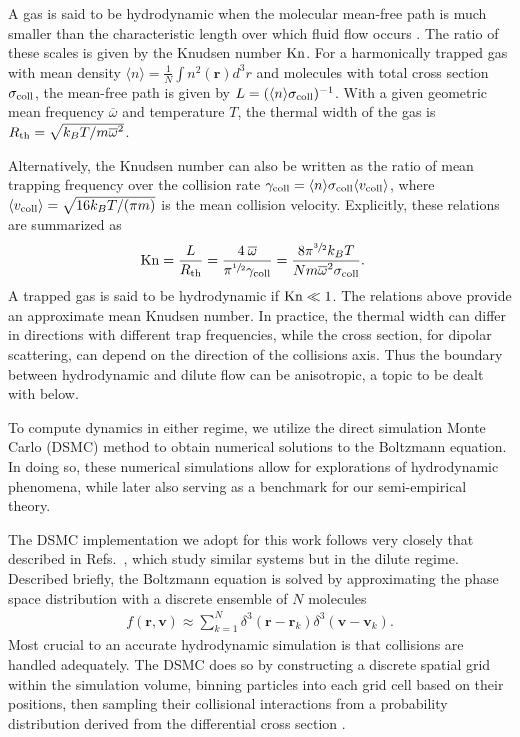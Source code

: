\documentclass[reprint, amsmath, amssymb, aps, superscriptaddress]{revtex4-1}
\begin{document}
 
A gas is said to be hydrodynamic when the molecular mean-free path is much smaller than the characteristic length over which fluid flow occurs \cite{Huang63_NY}. The ratio of these scales is given by the Knudsen number ${\rm Kn}$. For a harmonically trapped gas with mean density $\langle n \rangle = \frac{1}{N} \int n^2(\boldsymbol{r}) d^3 r$ and  molecules with total cross section $\sigma_{\rm coll}$, the mean-free path is given by
$L = ( \langle n \rangle \sigma_{\rm coll} )^{-1}$.  
With a given geometric mean frequency $\overline{\omega}$ and temperature $T$, the thermal width of the gas is
 $R_{\rm th} = \sqrt{ k_B T / m \overline{\omega}^2 }$.
 
Alternatively, the Knudsen number can also be written as the ratio of mean trapping frequency over the collision rate $\gamma_{\rm coll} = \langle n \rangle \sigma_{\rm coll} \langle v_{\rm coll} \rangle$, where $\langle v_{\rm coll} \rangle = \sqrt{ 16 k_B T / ( \pi m ) }$ is the mean collision velocity. Explicitly, these relations are summarized as  
\begin{align} \label{eq:Knudsen_number}
    {\rm Kn} 
    &= 
    \frac{ L }{ R_{\rm th} } 
    =
    \frac{ 4 \: \overline{\omega} }{ \pi^{\sfrac{1}{2}} \gamma_{\rm coll} } 
    =
    \frac{ 8 \pi^{\sfrac{3}{2}} k_B T }{ N m \overline{\omega}^2 \sigma_{\rm coll} }.
\end{align}
A trapped gas is said to be hydrodynamic if ${\rm Kn} \ll 1$. 
The relations above provide an approximate mean Knudsen number. In practice, the thermal width can differ in directions with different trap frequencies, while the cross section, for dipolar scattering, can depend on the direction of the collisions axis. Thus the boundary between hydrodynamic and dilute flow can be anisotropic, a topic to be dealt with below. 


To compute dynamics in either regime, we utilize the direct simulation Monte Carlo (DSMC) method \cite{Bird70_PF} to obtain numerical solutions to the Boltzmann equation. 
In doing so, these numerical simulations allow for explorations of hydrodynamic phenomena, while later also serving as a benchmark for our semi-empirical theory. 


The DSMC implementation we adopt for this work follows very closely that described in Refs.~\cite{Sykes15_PRA, Wang20_PRA}, which study similar systems but in the dilute regime. 
Described briefly, the Boltzmann equation is solved by approximating the phase space distribution with a discrete ensemble of $N$ molecules
\begin{align} \label{eq:phasespace_discretized}
    f(\boldsymbol{r}, \boldsymbol{v}) 
    \approx
    \sum_{ k = 1 }^{ N } \delta^3(\boldsymbol{r} - \boldsymbol{r}_k) \delta^3(\boldsymbol{v} - \boldsymbol{v}_k).
\end{align} 
Most crucial to an accurate hydrodynamic simulation is that collisions are handled adequately. The DSMC does so by constructing a discrete spatial grid within the simulation volume, binning particles into each grid cell based on their positions, then sampling their collisional interactions from a probability distribution derived from the differential cross section \cite{Sykes15_PRA}. 
\end{document}
